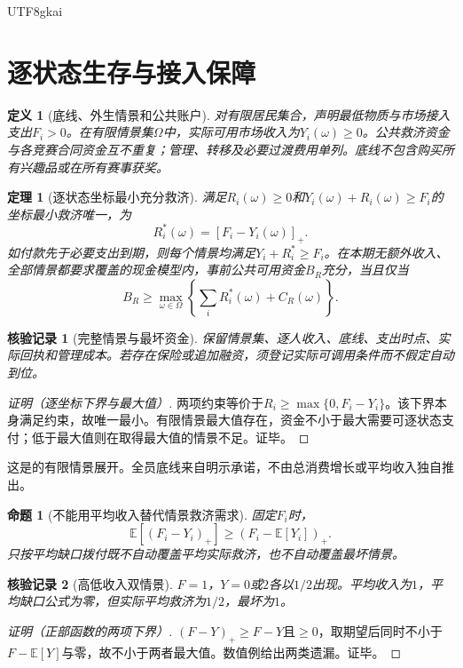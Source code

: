 \documentclass[12pt,a4paper,openany]{report}
\newtheorem{definition}{定义}[chapter]
\newtheorem{theorem}{定理}[chapter]
\newtheorem{proposition}{命题}[chapter]
\newtheorem{Certificate}{核验记录}[chapter]
\newcommand{\EE}{\mathbb E}
\begin{document}
\begin{CJK*}{UTF8}{gkai}
\section{逐状态生存与接入保障}
\begin{definition}[底线、外生情景和公共账户]
\label{def:floor}
对有限居民集合，声明最低物质与市场接入支出$F_i>0$。在有限情景集$\Omega$中，实际可用市场收入为$Y_i(\omega)\ge0$。公共救济资金与各竞赛合同资金互不重复；管理、转移及必要过渡费用单列。底线不包含购买所有兴趣品或在所有赛事获奖。
\end{definition}
\begin{theorem}[逐状态坐标最小充分救济]
\label{thm:floor}
满足$R_i(\omega)\ge0$和$Y_i(\omega)+R_i(\omega)\ge F_i$的坐标最小救济唯一，为
\begin{equation}\label{eq:floor}
 R_i^*(\omega)=[F_i-Y_i(\omega)]_+.
\end{equation}
如付款先于必要支出到期，则每个情景均满足$Y_i+R_i^*\ge F_i$。在本期无额外收入、全部情景都要求覆盖的现金模型内，事前公共可用资金$B_R$充分，当且仅当
\[
 B_R\ge\max_{\omega\in\Omega}\left\{\sum_iR_i^*(\omega)+C_R(\omega)\right\}.
\]
\end{theorem}
\begin{Certificate}[完整情景与最坏资金]
保留情景集、逐人收入、底线、支出时点、实际回执和管理成本。若存在保险或追加融资，须登记实际可调用条件而不假定自动到位。
\end{Certificate}
\begin{proof}[证明（逐坐标下界与最大值）]
两项约束等价于$R_i\ge\max\{0,F_i-Y_i\}$。该下界本身满足约束，故唯一最小。有限情景最大值存在，资金不小于最大需要可逐状态支付；低于最大值则在取得最大值的情景不足。证毕。
\end{proof}
这是\cite[“坐标最小充分救济的存在、唯一性与预算条件”]{SourceMarket}的有限情景展开。全员底线来自明示承诺，不由总消费增长或平均收入独自推出。

\begin{proposition}[不能用平均收入替代情景救济需求]
\label{prop:expected-relief}
固定$F_i$时，
\[
 \EE[(F_i-Y_i)_+]\ge(F_i-\EE[Y_i])_+.
\]
只按平均缺口拨付既不自动覆盖平均实际救济，也不自动覆盖最坏情景。
\end{proposition}
\begin{Certificate}[高低收入双情景]
$F=1$，$Y=0$或$2$各以$1/2$出现。平均收入为$1$，平均缺口公式为零，但实际平均救济为$1/2$，最坏为$1$。
\end{Certificate}
\begin{proof}[证明（正部函数的两项下界）]
$(F-Y)_+\ge F-Y$且$\ge0$，取期望后同时不小于$F-\EE[Y]$与零，故不小于两者最大值。数值例给出两类遗漏。证毕。
\end{proof}


\end{CJK*}
\end{document}
